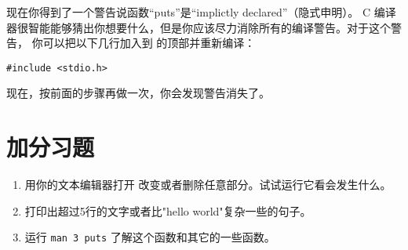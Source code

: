 现在你得到了一个警告说函数“puts”是“implictly declared”（隐式申明）。
C 编译器很智能能够猜出你想要什么，但是你应该尽力消除所有的编译警告。对于这个警告，
你可以把以下几行加入到  的顶部并重新编译：

\begin{lstlisting}
#include <stdio.h>
\end{lstlisting}

现在，按前面的步骤再做一次，你会发现警告消失了。

\section{加分习题}

\begin{enumerate}
\item 用你的文本编辑器打开  改变或者删除任意部分。试试运行它看会发生什么。
\item 打印出超过5行的文字或者比"hello world"复杂一些的句子。
\item 运行 \verb|man 3 puts| 了解这个函数和其它的一些函数。
\end{enumerate}


